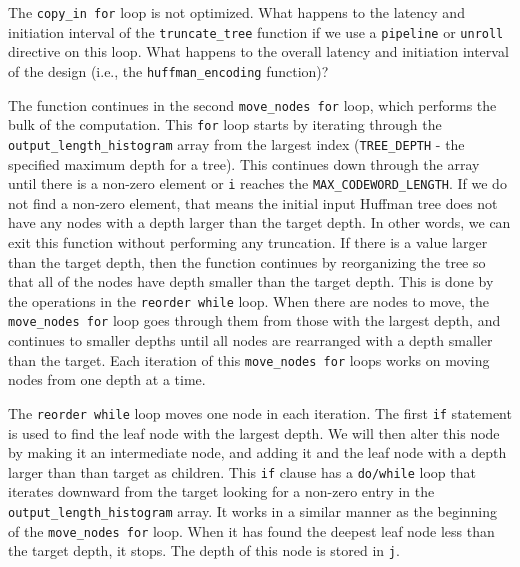 \begin{exercise}
The \lstinline{copy_in for} loop is not optimized. What happens to the latency and initiation interval of the \lstinline{truncate_tree} function if we use a \lstinline{pipeline} or \lstinline{unroll} directive on this loop. What happens to the overall latency and initiation interval of the design (i.e., the \lstinline{huffman_encoding} function)?
\end{exercise}

The function continues in the second \lstinline{move_nodes for} loop, which performs the bulk of the computation. This \lstinline{for} loop starts by iterating through the \lstinline{output_length_histogram} array from the largest index (\lstinline{TREE_DEPTH} - the specified maximum depth for a tree). This continues down through the array until there is a non-zero element or \lstinline{i} reaches the \lstinline{MAX_CODEWORD_LENGTH}. If we do not find a non-zero element, that means the initial input Huffman tree does not have any nodes with a depth larger than the target depth. In other words, we can exit this function without performing any truncation. If there is a value larger than the target depth, then the function continues by reorganizing the tree so that all of the nodes have depth smaller than the target depth. This is done by the operations in the \lstinline{reorder while} loop. When there are nodes to move, the \lstinline{move_nodes for} loop goes through them from those with the largest depth, and continues to smaller depths until all nodes are rearranged with a depth smaller than the target. Each iteration of this \lstinline{move_nodes for} loops works on moving nodes from one depth at a time.

The \lstinline{reorder while} loop moves one node in each iteration. The first \lstinline{if} statement is used to find the leaf node with the largest depth. We will then alter this node by making it an intermediate node, and adding it and the leaf node with a depth larger than than target as children. This \lstinline{if} clause has a \lstinline{do/while} loop that iterates downward from the target looking for a non-zero entry in the \lstinline{output_length_histogram} array. It works in a similar manner as the beginning of the \lstinline{move_nodes for} loop. When it has found the deepest leaf node less than the target depth, it stops. The depth of this node is stored in \lstinline{j}.

